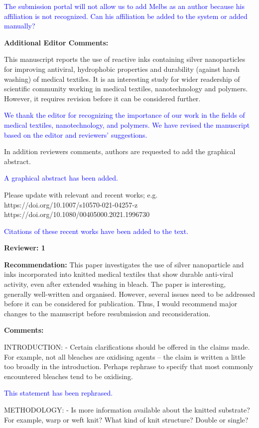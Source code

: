 \documentclass[12pt]{letter}
\newcommand{\blue}[1]{\textcolor{blue}{#1}} %
\begin{document}
\blue{The submission portal will not allow us to  add Melbs as an author because his affiliation is not recognized. Can his affiliation be added to the system or added manually?}

\textbf{Additional Editor Comments:}

This manuscript reports the use of reactive inks containing silver nanoparticles for improving antiviral, hydrophobic properties and durability (against harsh washing) of medical textiles. It is an interesting study for wider readership of scientific community working in medical textiles, nanotechnology and polymers. However, it requires revision before it can be considered further.

\blue{We thank the editor for recognizing the importance of our work in the fields of medical textiles, nanotechnology, and polymers.  We have revised the manuscript based on the editor and reviewers' suggestions.}

In addition reviewers comments, authors are requested to add the graphical abstract.

\blue{A graphical abstract has been added.}

Please update with relevant and recent works; e.g.
https://doi.org/10.1007/s10570-021-04257-z
https://doi.org/10.1080/00405000.2021.1996730

\blue{Citations of these recent works have been added to the text.}

\textbf{Reviewer: 1}

\textbf{Recommendation:} This paper investigates the use of silver nanoparticle and inks incorporated into knitted medical textiles that show durable anti-viral activity, even after extended washing in bleach. 
The paper is interesting, generally well-written and organised. 
However, several issues need to be addressed before it can be considered for publication. Thus, I would recommend major changes to the manuscript before resubmission and reconsideration.

\textbf{Comments:}

INTRODUCTION:
- Certain clarifications should be offered in the claims made. For example, not all bleaches are oxidising agents – the claim is written a little too broadly in the introduction. Perhaps rephrase to specify that most commonly encountered bleaches tend to be oxidising.

\blue{This statement has been rephrased.}

METHODOLOGY:
- Is more information available about the knitted substrate? For example, warp or weft knit? What kind of knit structure? Double or single?
\end{document}
